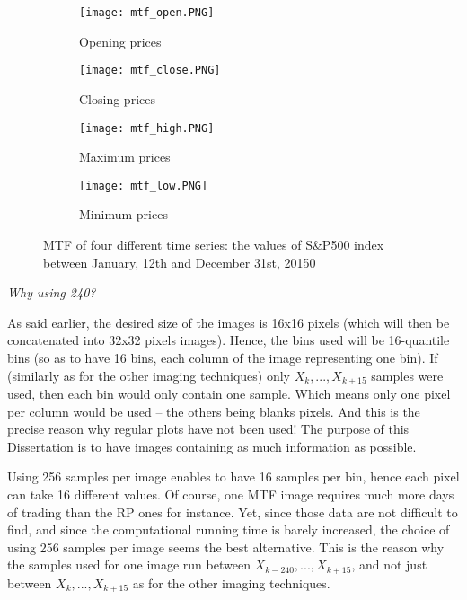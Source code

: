 \documentclass[11pt]{article}
\begin{document}
\begin{onehalfspace}
\begin{figure}[h!]
    \centering
    \captionsetup{justification=centering}
    \begin{subfigure}{0.24\textwidth}
        \texttt{[image: mtf\_open.PNG]}
        \caption{Opening prices}
        \label{fig:open_concat}
    \end{subfigure}
    \begin{subfigure}{0.24\textwidth}
        \texttt{[image: mtf\_close.PNG]}
        \caption{Closing prices}
    \end{subfigure}
    \begin{subfigure}{0.24\textwidth}
        \texttt{[image: mtf\_high.PNG]}
        \caption{Maximum prices}
    \end{subfigure}    
    \begin{subfigure}{0.24\textwidth}
        \texttt{[image: mtf\_low.PNG]}
        \caption{Minimum prices}
    \end{subfigure}
    \caption{MTF of four different time series: the values of S\&P500 index between January, 12th and December 31st, 20150}
    \label{fig:mtf4}
\end{figure}

\noindent \textit{Why using 240?}

As said earlier, the desired size of the images is 16x16 pixels (which will then be concatenated into 32x32 pixels images). Hence, the bins used will be 16-quantile bins (so as to have 16 bins, each column of the image representing one bin). If (similarly as for the other imaging techniques) only $X_k,..., X_{k+15}$ samples were used, then each bin would only contain one sample. Which means only one pixel per column would be used -- the others being blanks pixels. And this is the precise reason why regular plots have not been used! The purpose of this Dissertation is to have images containing as much information as possible. 

Using 256 samples per image enables to have 16 samples per bin, hence each pixel can take 16 different values. Of course, one MTF image requires much more days of trading than the RP ones for instance. Yet, since those data are not difficult to find, and since the computational running time is barely increased, the choice of using 256 samples per image seems the best alternative. This is the reason why the samples used for one image run between $X_{k-240},... ,X_{k+15}$, and not just between $X_k,...,X_{k+15}$ as for the other imaging techniques.




\end{onehalfspace}
\end{document}

